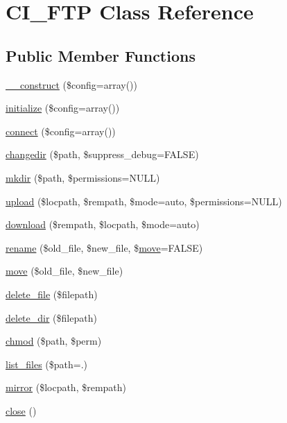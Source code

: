 \hypertarget{class_c_i___f_t_p}{}\section{C\+I\+\_\+\+F\+TP Class Reference}
\label{class_c_i___f_t_p}
\subsection*{Public Member Functions}
\begin{DoxyCompactItemize}
\item 
\mbox{\hyperlink{class_c_i___f_t_p_af7f9493844d2d66e924e3c1df51ce616}{\+\_\+\+\_\+construct}} (\$config=array())
\item 
\mbox{\hyperlink{class_c_i___f_t_p_a481385e36d920f5a5005ace05c6cd016}{initialize}} (\$config=array())
\item 
\mbox{\hyperlink{class_c_i___f_t_p_ab2827759611aaaf0c59e69661122c534}{connect}} (\$config=array())
\item 
\mbox{\hyperlink{class_c_i___f_t_p_a81098bf710d7879da8d69130f136475b}{changedir}} (\$path, \$suppress\+\_\+debug=F\+A\+L\+SE)
\item 
\mbox{\hyperlink{class_c_i___f_t_p_a077f5ce3771d83b8196e07ccc27e49ff}{mkdir}} (\$path, \$permissions=N\+U\+LL)
\item 
\mbox{\hyperlink{class_c_i___f_t_p_a6e11a64f2c0a3f8f1659f4e32032031d}{upload}} (\$locpath, \$rempath, \$mode=\textquotesingle{}auto\textquotesingle{}, \$permissions=N\+U\+LL)
\item 
\mbox{\hyperlink{class_c_i___f_t_p_aefb1987159bc6c547d8c02b2e5aa2f25}{download}} (\$rempath, \$locpath, \$mode=\textquotesingle{}auto\textquotesingle{})
\item 
\mbox{\hyperlink{class_c_i___f_t_p_aa670f7340bb15f61d481f4b3c64bd9dc}{rename}} (\$old\+\_\+file, \$new\+\_\+file, \$\mbox{\hyperlink{class_c_i___f_t_p_acb1443339c3058c83b79f0f503630920}{move}}=F\+A\+L\+SE)
\item 
\mbox{\hyperlink{class_c_i___f_t_p_acb1443339c3058c83b79f0f503630920}{move}} (\$old\+\_\+file, \$new\+\_\+file)
\item 
\mbox{\hyperlink{class_c_i___f_t_p_aad793fb503643d98b58426421718e18a}{delete\+\_\+file}} (\$filepath)
\item 
\mbox{\hyperlink{class_c_i___f_t_p_af09b3ab08984b145506dcff4f75a051c}{delete\+\_\+dir}} (\$filepath)
\item 
\mbox{\hyperlink{class_c_i___f_t_p_a9af83eefaf53c7362e7108d1f82bf1ab}{chmod}} (\$path, \$perm)
\item 
\mbox{\hyperlink{class_c_i___f_t_p_a2a40473caefcd36b60e3e96b3395975c}{list\+\_\+files}} (\$path=\textquotesingle{}.\textquotesingle{})
\item 
\mbox{\hyperlink{class_c_i___f_t_p_aea2de30bbdf050cb607bbc5a36772bf3}{mirror}} (\$locpath, \$rempath)
\item 
\mbox{\hyperlink{class_c_i___f_t_p_aa69c8bf1f1dcf4e72552efff1fe3e87e}{close}} ()
\end{DoxyCompactItemize}
